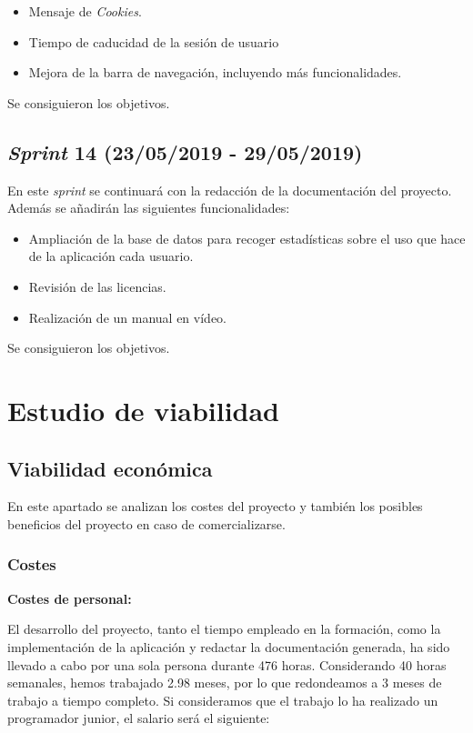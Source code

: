 \begin{itemize}
\item Mensaje de \emph{Cookies}.

\item Tiempo de caducidad de la sesión de usuario

\item Mejora de la barra de navegación, incluyendo más funcionalidades.
\end{itemize}
Se consiguieron los objetivos.

\subsection{\emph{Sprint} 14 (23/05/2019 - 29/05/2019)}

En este \emph{sprint} se continuará con la redacción de la documentación del proyecto. Además se añadirán las siguientes funcionalidades:

\begin{itemize}
\item Ampliación de la base de datos para recoger estadísticas sobre el uso que hace de la aplicación cada usuario.

\item Revisión de las licencias.

\item Realización de un manual en vídeo.
\end{itemize}
Se consiguieron los objetivos.

\section{Estudio de viabilidad}

\subsection{Viabilidad económica}

En este apartado se analizan los costes del proyecto y también los posibles  beneficios del proyecto en caso de comercializarse.

\subsubsection{Costes}
\textbf{Costes de personal:}

El desarrollo del proyecto, tanto el tiempo empleado en la formación, como la implementación de la aplicación y redactar la documentación
generada, ha sido llevado a cabo por una sola persona durante 476 horas. Considerando 40 horas semanales, hemos trabajado 2.98  meses, por lo que redondeamos a 3 meses de trabajo a tiempo completo. Si consideramos que el trabajo lo ha realizado un programador junior, el salario será el siguiente:

